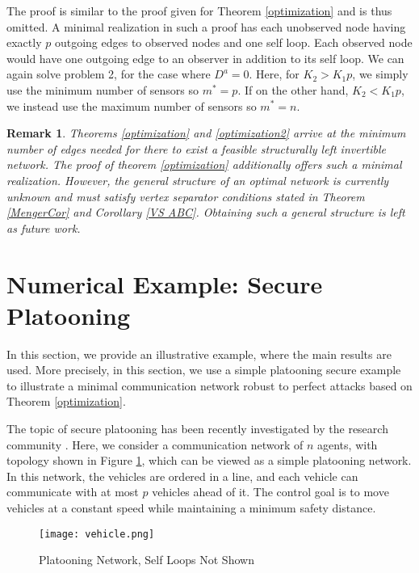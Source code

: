 \documentclass[letterpaper, 10 pt, conference]{ieeeconf}
\newtheorem{remark}[theorem]{Remark}
\begin{document}
The proof is similar to the proof given for  Theorem \ref{optimization} and is thus omitted. A minimal realization in such a proof has each unobserved node having exactly $p$ outgoing edges to observed nodes and one self loop. Each observed node would have one outgoing edge to an observer in addition to its self loop. We can again solve problem 2, for the case where $D^a = 0$. Here, for $K_2 > K_1 p$, we simply use the minimum number of sensors so $m^* = p$. If on the other hand, $K_2 < K_1 p$, we instead use the maximum number of sensors so $m^* = n$.
\begin{remark}
Theorems \ref{optimization} and \ref{optimization2} arrive at the minimum number of edges needed for there to exist a feasible structurally left invertible network. The proof of theorem \ref{optimization} additionally offers such a minimal realization. However, the general structure of an optimal network is currently unknown and must satisfy vertex separator conditions stated in Theorem \ref{MengerCor} and Corollary \ref{VS ABC}. Obtaining such a general structure is left as future work.
\end{remark}


\section{Numerical Example: Secure Platooning}\label{examples}

In this section, we provide an illustrative example, where the main results are used. More precisely, in this section, we use a simple platooning secure example to illustrate a minimal communication network robust to perfect attacks based on Theorem \ref{optimization}.  

The topic of secure platooning has been recently investigated by the research community \cite{Bruce2015}. Here, we consider a communication network of $n$ agents, with topology shown in Figure \ref{fig:vehicles}, which can be viewed as a simple platooning network. In this network, the vehicles are ordered in a line, and each vehicle can communicate with at most $p$ vehicles ahead of it. The control goal is to move vehicles at a constant speed while maintaining a minimum safety distance.

\begin{figure}[htb]
\centering
\texttt{[image: vehicle.png]}
\caption{Platooning Network, Self Loops Not Shown}
\label{fig:vehicles}
\end{figure}
\end{document}
